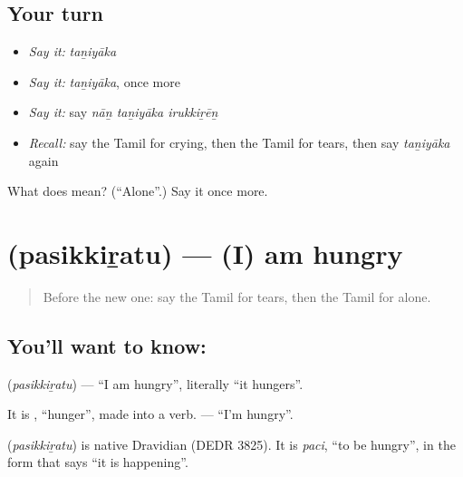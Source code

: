 \subsection*{Your turn}
\begin{itemize}
\raggedright
  \item \emph{Say it:} \emph{taṉiyāka}
  \item \emph{Say it:} \emph{taṉiyāka}, once more
  \item \emph{Say it:} say \emph{nāṉ taṉiyāka irukkiṟēṉ}
  \item \emph{Recall:} say the Tamil for crying, then the Tamil for tears, then say \emph{taṉiyāka} again
\end{itemize}

\begin{tcolorbox}[breakable,colback=teal!4,colframe=teal!35!black,title={Before you move on}]
What does  mean? (\textquotedblleft{}Alone\textquotedblright{}.) Say it once more.
\end{tcolorbox}
\section[\texorpdfstring{\ta{பசிக்கிறது} (pasikkiṟatu)}{பசிக்கிறது (pasikkiṟatu)}]{ (pasikkiṟatu) — (I) am hungry}

\label{lesson:TA-C90-hungry}



\begin{quote}
Before the new one: say the Tamil for tears, then the Tamil for alone.
\end{quote}

\subsection*{You'll want to know: }
\textbf{} (\emph{pasikkiṟatu}) — \textquotedblleft{}I am hungry\textquotedblright{}, literally \textquotedblleft{}it hungers\textquotedblright{}.

It is \textbf{}, \textquotedblleft{}hunger\textquotedblright{}, made into a verb. \textbf{ } — \textquotedblleft{}I'm hungry\textquotedblright{}.

\begin{cousinweb}
\textbf{} (\emph{pasikkiṟatu}) is native Dravidian (DEDR 3825). It is \emph{paci}, \textquotedblleft{}to be hungry\textquotedblright{}, in the form that says \textquotedblleft{}it is happening\textquotedblright{}.
\end{cousinweb}

